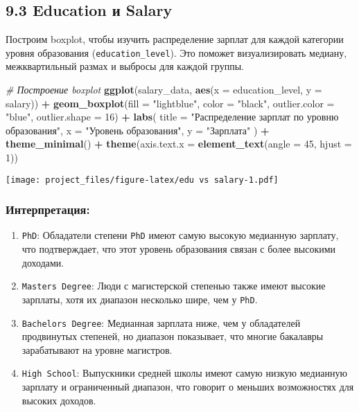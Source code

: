 \documentclass[
]{article}
\newenvironment{Shaded}{\begin{snugshade}}{\end{snugshade}}
\newcommand{\AttributeTok}[1]{\textcolor[rgb]{0.13,0.29,0.53}{#1}}
\newcommand{\CommentTok}[1]{\textcolor[rgb]{0.56,0.35,0.01}{\textit{#1}}}
\newcommand{\DecValTok}[1]{\textcolor[rgb]{0.00,0.00,0.81}{#1}}
\newcommand{\FunctionTok}[1]{\textcolor[rgb]{0.13,0.29,0.53}{\textbf{#1}}}
\newcommand{\NormalTok}[1]{#1}
\newcommand{\SpecialCharTok}[1]{\textcolor[rgb]{0.81,0.36,0.00}{\textbf{#1}}}
\newcommand{\StringTok}[1]{\textcolor[rgb]{0.31,0.60,0.02}{#1}}
\providecommand{\tightlist}{%
  \setlength{\itemsep}{0pt}\setlength{\parskip}{0pt}}
\begin{document}
\subsection{9.3 Education и Salary}\label{education-ux438-salary}

Построим boxplot, чтобы изучить распределение зарплат для каждой
категории уровня образования (\texttt{education\_level}). Это поможет
визуализировать медиану, межквартильный размах и выбросы для каждой
группы.

\begin{Shaded}
\begin{Highlighting}[]
\CommentTok{\# Построение boxplot}
\FunctionTok{ggplot}\NormalTok{(salary\_data, }\FunctionTok{aes}\NormalTok{(}\AttributeTok{x =}\NormalTok{ education\_level, }\AttributeTok{y =}\NormalTok{ salary)) }\SpecialCharTok{+}
  \FunctionTok{geom\_boxplot}\NormalTok{(}\AttributeTok{fill =} \StringTok{"lightblue"}\NormalTok{, }\AttributeTok{color =} \StringTok{"black"}\NormalTok{, }\AttributeTok{outlier.color =} \StringTok{"blue"}\NormalTok{, }\AttributeTok{outlier.shape =} \DecValTok{16}\NormalTok{) }\SpecialCharTok{+}
  \FunctionTok{labs}\NormalTok{(}
    \AttributeTok{title =} \StringTok{"Распределение зарплат по уровню образования"}\NormalTok{,}
    \AttributeTok{x =} \StringTok{"Уровень образования"}\NormalTok{,}
    \AttributeTok{y =} \StringTok{"Зарплата"}
\NormalTok{  ) }\SpecialCharTok{+}
  \FunctionTok{theme\_minimal}\NormalTok{() }\SpecialCharTok{+}
  \FunctionTok{theme}\NormalTok{(}\AttributeTok{axis.text.x =} \FunctionTok{element\_text}\NormalTok{(}\AttributeTok{angle =} \DecValTok{45}\NormalTok{, }\AttributeTok{hjust =} \DecValTok{1}\NormalTok{))}
\end{Highlighting}
\end{Shaded}

\texttt{[image: project\_files/figure-latex/edu vs salary-1.pdf]}

\subsubsection{Интерпретация:}\label{ux438ux43dux442ux435ux440ux43fux440ux435ux442ux430ux446ux438ux44f}

\begin{enumerate}
\def\labelenumi{\arabic{enumi}.}
\tightlist
\item
  \texttt{PhD}: Обладатели степени \texttt{PhD} имеют самую высокую
  медианную зарплату, что подтверждает, что этот уровень образования
  связан с более высокими доходами.
\item
  \texttt{Master\textquotesingle{}s\ Degree}: Люди с магистерской
  степенью также имеют высокие зарплаты, хотя их диапазон несколько
  шире, чем у \texttt{PhD}.
\item
  \texttt{Bachelor\textquotesingle{}s\ Degree}: Медианная зарплата ниже,
  чем у обладателей продвинутых степеней, но диапазон показывает, что
  многие бакалавры зарабатывают на уровне магистров.
\item
  \texttt{High\ School}: Выпускники средней школы имеют самую низкую
  медианную зарплату и ограниченный диапазон, что говорит о меньших
  возможностях для высоких доходов.
\end{enumerate}
\end{document}
